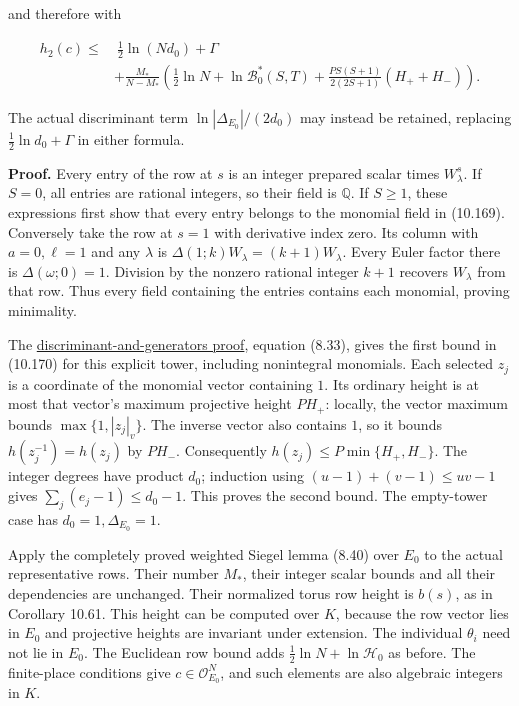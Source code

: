 \documentclass[
  11pt,
  a4paper,
]{article}
\begin{document}
and therefore with

\[
\begin{aligned}
h_2(c)\le&\ \frac12\ln(Nd_0)+\Gamma\\
&+\frac{M_*}{N-M_*}
\left(\frac12\ln N+\ln\mathcal B_0^*(S,T)
+\frac{PS(S+1)}{2(2S+1)}(H_++H_-)\right).
\end{aligned}
\tag{10.172}
\]

The actual discriminant term \(\ln|\Delta_{E_0}|/(2d_0)\) may instead be
retained, replacing \(\frac12\ln d_0+\Gamma\) in either formula.

\textbf{Proof.} Every entry of the row at \(s\) is an integer prepared
scalar times \(W_\lambda^s\). If \(S=0\), all entries are rational
integers, so their field is \(\mathbb Q\). If \(S\ge1\), these
expressions first show that every entry belongs to the monomial field in
(10.169). Conversely take the row at \(s=1\) with derivative index zero.
Its column with \(a=0,\ell=1\) and any \(\lambda\) is
\(\Delta(1;k)W_\lambda=(k+1)W_\lambda\). Every Euler factor there is
\(\Delta(\omega;0)=1\). Division by the nonzero rational integer \(k+1\)
recovers \(W_\lambda\) from that row. Thus every field containing the
entries contains each monomial, proving minimality.

The
\href{../TR-BAKER-08.html\#the-discriminant-of-the-coefficient-field}{discriminant-and-generators
proof}, equation (8.33), gives the first bound in (10.170) for this
explicit tower, including nonintegral monomials. Each selected \(z_j\)
is a coordinate of the monomial vector containing \(1\). Its ordinary
height is at most that vector's maximum projective height \(PH_+\):
locally, the vector maximum bounds \(\max\{1,|z_j|_v\}\). The inverse
vector also contains \(1\), so it bounds \(h(z_j^{-1})=h(z_j)\) by
\(PH_-\). Consequently \(h(z_j)\le P\min\{H_+,H_-\}\). The integer
degrees have product \(d_0\); induction using \((u-1)+(v-1)\le uv-1\)
gives \(\sum_j(e_j-1)\le d_0-1\). This proves the second bound. The
empty-tower case has \(d_0=1,\Delta_{E_0}=1\).

Apply the completely proved weighted Siegel lemma (8.40) over \(E_0\) to
the actual representative rows. Their number \(M_*\), their integer
scalar bounds and all their dependencies are unchanged. Their normalized
torus row height is \(b(s)\), as in Corollary 10.61. This height can be
computed over \(K\), because the row vector lies in \(E_0\) and
projective heights are invariant under extension. The individual
\(\theta_i\) need not lie in \(E_0\). The Euclidean row bound adds
\(\frac12\ln N+\ln\mathcal H_0\) as before. The finite-place conditions
give \(c\in\mathcal O_{E_0}^N\), and such elements are also algebraic
integers in \(K\).
\end{document}
